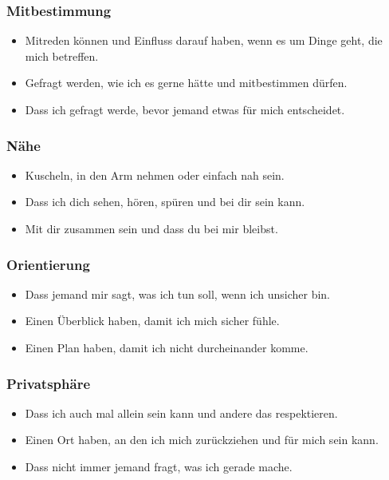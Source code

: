 \subsubsection{Mitbestimmung}

\begin{itemize}
    \item Mitreden können und Einfluss darauf haben, wenn es um Dinge geht, die mich betreffen.
    \item Gefragt werden, wie ich es gerne hätte und mitbestimmen dürfen.
    \item Dass ich gefragt werde, bevor jemand etwas für mich entscheidet.
\end{itemize}

\subsubsection{Nähe}

\begin{itemize}
    \item Kuscheln, in den Arm nehmen oder einfach nah sein.
    \item Dass ich dich sehen, hören, spüren und bei dir sein kann.
    \item Mit dir zusammen sein und dass du bei mir bleibst.
\end{itemize}

\subsubsection{Orientierung}

\begin{itemize}
    \item Dass jemand mir sagt, was ich tun soll, wenn ich unsicher bin.
    \item Einen Überblick haben, damit ich mich sicher fühle.
    \item Einen Plan haben, damit ich nicht durcheinander komme.
\end{itemize}

\subsubsection{Privatsphäre}

\begin{itemize}
    \item Dass ich auch mal allein sein kann und andere das respektieren.
    \item Einen Ort haben, an den ich mich zurückziehen und für mich sein kann.
    \item Dass nicht immer jemand fragt, was ich gerade mache.
\end{itemize}

